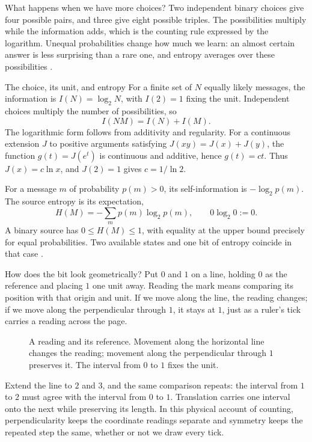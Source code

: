 \documentclass[11pt,a4paper]{article}
\theoremstyle{definition}
\begin{document}
What happens when we have more choices? Two independent binary
choices give four possible pairs, and three give eight possible
triples. The possibilities multiply while the information adds,
which is the counting rule expressed by the logarithm. Unequal
probabilities change how much we learn: an almost certain answer
is less surprising than a rare one, and entropy averages over
these possibilities \citep{Shannon1948}.

\begin{formalnote}{The choice, its unit, and entropy}
For a finite set of $N$ equally likely messages, the information is
$I(N)=\log_2N$, with $I(2)=1$ fixing the unit. Independent choices
multiply the number of possibilities, so
\[
 I(NM)=I(N)+I(M).
\]
The logarithmic form follows from additivity and regularity. For
a continuous extension $J$ to positive arguments satisfying
$J(xy)=J(x)+J(y)$, the function $g(t)=J(e^t)$ is continuous and
additive, hence $g(t)=ct$. Thus $J(x)=c\ln x$, and $J(2)=1$
gives $c=1/\ln2$.

For a message $m$ of probability $p(m)>0$, its self-information is
$-\log_2p(m)$. The source entropy is its expectation,
\[
 H(M)=-\sum_m p(m)\log_2p(m),\qquad 0\log_2 0:=0.
\]
A binary source has $0\leq H(M)\leq1$, with equality at the upper
bound precisely for equal probabilities. Two available states and
one bit of entropy coincide in that case \citep{Shannon1948}.
\end{formalnote}

How does the bit look geometrically? Put $0$ and $1$ on a line,
holding $0$ as the reference and placing $1$ one unit away. Reading
the mark means comparing its position with that origin and unit.
If we move along the line, the reading changes; if we move along
the perpendicular through $1$, it stays at $1$, just as a ruler's
tick carries a reading across the page.

\begin{figure}[H]
\centering

\caption{A reading and its reference. Movement along the horizontal
line changes the reading; movement along the perpendicular through
$1$ preserves it. The interval from $0$ to $1$ fixes the unit.}
\label{fig:v1-reference}
\end{figure}

Extend the line to $2$ and $3$, and the same comparison repeats:
the interval from $1$ to $2$ must agree with the interval from $0$
to $1$. Translation carries one interval onto the next while
preserving its length. In this physical account of counting,
perpendicularity keeps the coordinate readings separate and
symmetry keeps the repeated step the same, whether or not we
draw every tick.
\end{document}
